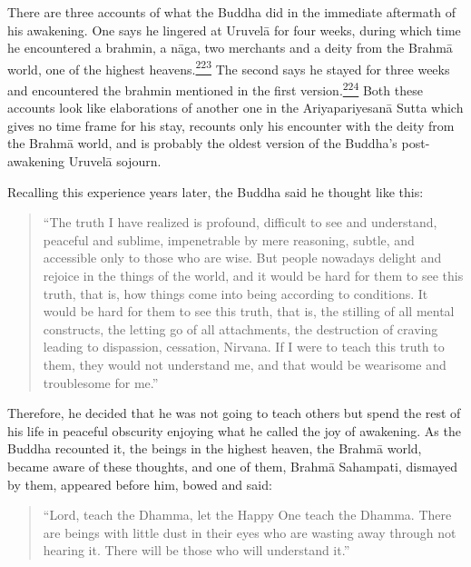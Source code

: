 There are three accounts of what the Buddha did in the immediate
aftermath of his awakening. One says he lingered at Uruvelā for four
weeks, during which time he encountered a brahmin, a nāga, two merchants
and a deity from the Brahmā world, one of the highest
heavens.\label{footprints_split_009.html_fnref223}\hyperref[footprints_split_024.htmlux5cux23fn223]{\textsuperscript{223}}
The second says he stayed for three weeks and encountered the brahmin
mentioned in the first
version.\label{footprints_split_009.html_fnref224}\hyperref[footprints_split_024.htmlux5cux23fn224]{\textsuperscript{224}}
Both these accounts look like elaborations of another one in the
Ariyapariyesanā Sutta which gives no time frame for his stay, recounts
only his encounter with the deity from the Brahmā world, and is probably
the oldest version of the Buddha's post-awakening Uruvelā sojourn.

Recalling this experience years later, the Buddha said he thought like
this:

\begin{quote}
``The truth I have realized is profound, difficult to see and
understand, peaceful and sublime, impenetrable by mere reasoning,
subtle, and accessible only to those who are wise. But people nowadays
delight and rejoice in the things of the world, and it would be hard for
them to see this truth, that is, how things come into being according to
conditions. It would be hard for them to see this truth, that is, the
stilling of all mental constructs, the letting go of all attachments,
the destruction of craving leading to dispassion, cessation, Nirvana. If
I were to teach this truth to them, they would not understand me, and
that would be wearisome and troublesome for me.''
\end{quote}

Therefore, he decided that he was not going to teach others but spend
the rest of his life in peaceful obscurity enjoying what he called the
joy of awakening. As the Buddha recounted it, the beings in the highest
heaven, the Brahmā world, became aware of these thoughts, and one of
them, Brahmā Sahampati, dismayed by them, appeared before him, bowed and
said:

\begin{quote}
``Lord, teach the Dhamma, let the Happy One teach the Dhamma. There are
beings with little dust in their eyes who are wasting away through not
hearing it. There will be those who will understand it.''
\end{quote}

